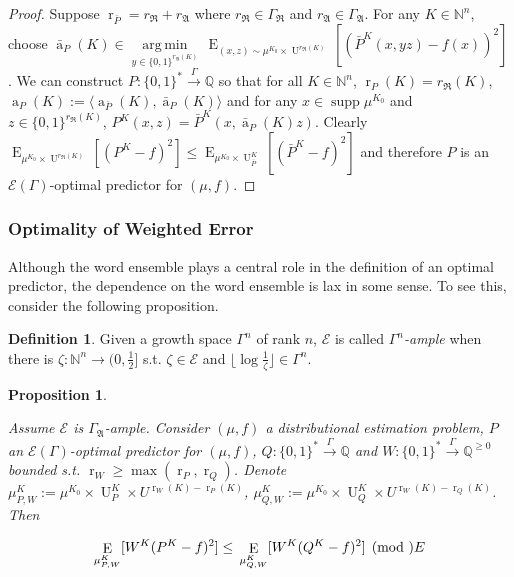 \documentclass{article}
\numberwithin{equation}{section}
\theoremstyle{definition}
\newtheorem{definition}{Definition}[section]
\theoremstyle{plain}
\newtheorem{proposition}{Proposition}[section]
\newcommand{\Bool}{\{0,1\}}
\newcommand{\Words}{{\Bool^*}}
\newcommand{\WordsLen}[1]{{\Bool^{#1}}}
\DeclareMathOperator{\Supp}{supp}
\DeclareMathOperator{\E}{E}
\DeclareMathOperator{\R}{r}
\DeclareMathOperator{\A}{a}
\DeclareMathOperator{\Un}{U}
\newcommand{\Argmin}[1]{\underset{#1}{\operatorname{arg\,min}}\,}
\newcommand{\Nats}{\mathbb{N}}
\newcommand{\Rats}{\mathbb{Q}}
\newcommand{\Floor}[1]{\lfloor #1 \rfloor}
\newcommand{\Chev}[1]{\langle #1 \rangle}
\newcommand{\GrowR}{\Gamma_{\mathfrak{R}}}
\newcommand{\GrowA}{\Gamma_{\mathfrak{A}}}
\newcommand{\Fall}{\mathcal{E}}
\newcommand{\EG}{\Fall(\Gamma)}
\newcommand{\Scheme}{\xrightarrow{\Gamma}}
\begin{document}
\begin{proof}

Suppose $\R_{\bar{P}}=r_{\mathfrak{R}}+r_{\mathfrak{A}}$ where $r_{\mathfrak{R}} \in \GrowR$ and $r_{\mathfrak{A}} \in \GrowA$. For any ${K \in \Nats^n}$, choose ${\bar{\A}_P(K) \in \Argmin{y \in \WordsLen{r_{\mathfrak{A}}(K)}} \E_{(x,z) \sim \mu^{K_0} \times \Un^{r_{\mathfrak{R}}(K)}}[(\bar{P}^{K}(x,yz) - f(x))^2]}$. We can construct $P: \Words \Scheme \Rats$ so that for all $K \in \Nats^n$, $\R_P(K) = r_{\mathfrak{R}}(K)$, ${\A_P(K):=\Chev{\A_{\bar{P}}(K),\bar{\A}_P(K)}}$ and for any $x \in \Supp \mu^{K_0}$ and $z \in \WordsLen{r_{\mathfrak{R}}(K)}$, ${P^{K}(x,z)=\bar{P}^{K}(x,\bar{\A}_P(K)z)}$. Clearly ${\E_{\mu^{K_0} \times \Un^{r_{\mathfrak{R}}(K)}}[(P^{K} - f)^2] \leq \E_{\mu^{K_0} \times \Un_{\bar{P}}^{K}}[(\bar{P}^{K} - f)^2]}$ and therefore $P$ is an $\EG$-optimal predictor for $(\mu,f)$.
\end{proof}

\subsubsection{Optimality of Weighted Error}

Although the word ensemble plays a central role in the definition of an optimal predictor, the dependence on the word ensemble is lax in some sense. To see this, consider the following proposition.

\begin{definition}

Given a growth space $\Gamma^n$ of rank $n$, $\Fall$ is called \emph{$\Gamma^n$-ample} when there is $\zeta: \Nats^n \rightarrow (0,\frac{1}{2}]$ s.t.  $\zeta \in \Fall$ and $\Floor{\log \frac{1}{\zeta}} \in \Gamma^n$.

\end{definition}

\begin{proposition}
\label{prp:weight}

Assume $\Fall$ is $\GrowA$-ample. Consider $(\mu,f)$ a distributional estimation problem, $P$ an $\EG$-optimal predictor for $(\mu,f)$, $Q: \Words \Scheme \Rats$ and ${W: \Words \Scheme \Rats^{\geq 0}}$ bounded s.t. $\R_W \geq \max(\R_P, \R_Q)$. Denote ${\mu^{K}_{P,W}:=\mu^{K_0} \times \Un_P^{K} \times U^{\R_W(K)-\R_P(K)}}$, ${\mu^{K}_{Q,W}:=\mu^{K_0} \times \Un_Q^{K} \times U^{\R_W(K)-\R_Q(K)}}$. Then

\begin{equation}
\E_{\mu^{K}_{P,W}}[W^{K}(P^{K} - f)^2] \leq \\ \E_{\mu^{K}_{Q,W}}[W^{K}(Q^{K} - f)^2] \pmod \Fall
\end{equation}

\end{proposition}
\end{document}
